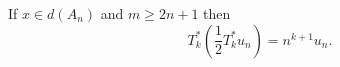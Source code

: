 If $x \in d(A_n)$ and $m \geq 2n + 1$ then
$$T_k^* \left( \frac{1}{2} T_k^* u_n \right) = n^{k+1} u_n.$$
